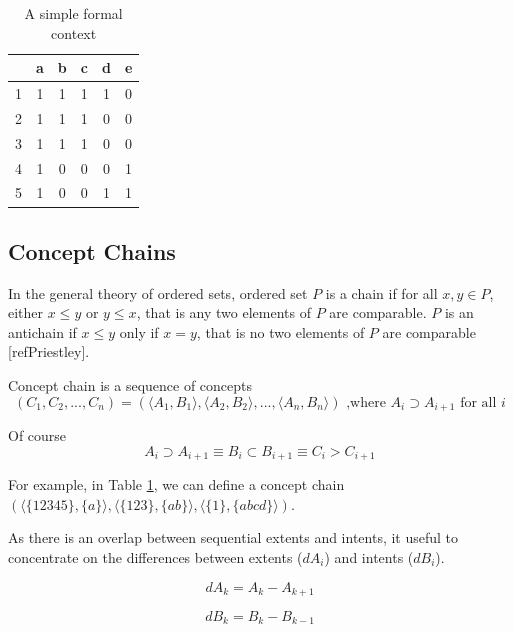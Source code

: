 \documentclass[acmconf,authordraft]{acmart}
\begin{document}
\begin{table}
  \caption{A simple  formal context}
  \label{tab:simplecontext}
  \begin{tabular}{lccccc}
    \toprule
    & a & b & c & d & e\\
    \midrule
    1 & 1 & 1 & 1 & 1 & 0\\
    2 & 1 & 1 & 1 & 0 & 0\\
    3 & 1 & 1 & 1 & 0 & 0\\
    4 & 1 & 0 & 0 & 0 & 1\\
    5 & 1 & 0 & 0 & 1 & 1\\
  \bottomrule
\end{tabular}
\end{table}

\subsection{Concept Chains}

In the general theory of ordered sets, ordered set $P$ is a chain if for all $x, y \in P$, either $x \leq y$ or $y \leq x$, that is any two elements of $P$ are comparable. $P$ is an antichain if $x \leq y$ only if $x=y$, that is no two elements of $P$ are comparable [refPriestley].

Concept chain is a sequence of concepts
\begin{equation}
  (C_1, C_2,..., C_n) = (\langle A_1, B_1 \rangle,\langle A_2,B_2 \rangle,  ..., \langle A_n,B_n \rangle)  \text{ ,where  }  A_i \supset  A_{i+1} \text{ for all } i
\end{equation}

Of course
\begin{displaymath}
A_i \supset A_{i+1} \equiv B_i \subset B_{i+1} \equiv C_i > C_{i+1}
\end{displaymath}

For example, in Table \ref{tab:simplecontext}, we can define a concept chain 
$(\langle \{12345\}, \{a\} \rangle,
 \langle \{123\}, \{ab\} \rangle,  
 \langle \{1\}, \{abcd\} \rangle)$.

As there is an overlap between sequential extents and intents, it useful to concentrate on the differences between extents ($dA_i$) and intents ($dB_i$).

\begin{equation}
dA_k = A_k - A_{k+1}
\end{equation}

\begin{equation}
dB_k = B_k - B_{k-1}
\end{equation}
\end{document}
